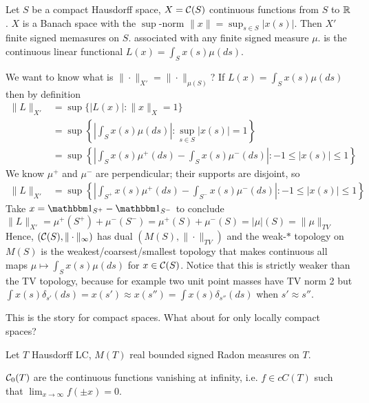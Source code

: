 \begin{example}
  Let $S$ be a compact Hausdorff space,
  $X = \mathcal{C}(S)$ continuous functions from $S$ to $\mathbb{R}$.
  $X$ is a Banach space with the $\sup$-norm $\|x\| = \sup_{s \in S} \lvert x(s) \rvert$.
  Then $X'$ finite signed memasures on $S$.
  associated with any finite signed measure $\mu$.
  is the continuous linear functional $L(x) = \int_S x(s) \mu(ds)$.

  We want to know what is $\|\cdot\|_{X'} = \|\cdot\|_{\mu(S)}$?
  If $L(x) = \int_S x(s) \mu(ds)$ then by definition
  \begin{align*}
    \|L\|_{X'} 
  &= \sup\{ \lvert L(x) \rvert : \|x\|_X = 1 \} \\
  &= \sup\left\{ \left\lvert \int_S x(s) \mu(ds) \right\rvert : \sup_{s \in S} \lvert x(s) \rvert = 1 \right\} \\
  &= \sup\left\{ \left\lvert \int_S x(s) \mu^+(ds)  - \int_S x(s) \mu^-(ds) \right\rvert : -1 \leq \lvert x(s) \rvert \leq 1 \right\}
\end{align*}
We know $\mu^+$ and $\mu^-$ are perpendicular; their supports are disjoint, so
\begin{align*}
  \|L\|_{X'} 
  &= \sup\left\{ \left\lvert 
      \int_{S^+} x(s) \mu^+(ds)  - \int_{S^-} x(s) \mu^-(ds)
  \right\rvert : -1 \leq \lvert x(s) \rvert \leq 1 \right\}
\end{align*}
Take $x = \ind_{S^+} - \ind_{S^-}$ to conclude
$\|L\|_{X'} = \mu^+(S^+) + \mu^-(S^-) = \mu^+(S) + \mu^-(S) = \lvert \mu \rvert(S) = \|\mu\|_{TV}$
Hence, $(\mathcal{C}(S), \|\cdot\|_{\infty})$ has dual
$(M(S), \|\cdot\|_{TV})$ and the weak-$\ast$ topology on $M(S)$
is the weakest/coarsest/smallest topology that makes continuous
all maps $\mu \mapsto \int_S x(s) \mu(ds)$ for $x \in \mathcal{C}(S)$.
Notice that this is strictly weaker than the TV topology, because for example
two unit point masses have TV norm 2 but
$\int x(s) \delta_{s'}(ds) = x(s') \approx x(s'') = \int x(s) \delta_{s''}(ds)$
when $s' \approx s''$.
\end{example}

This is the story for compact spaces. What about for only locally compact spaces?

Let $T$ Hausdorff LC, $M(T)$ real bounded signed Radon measures on $T$.
\begin{definition}
  $\mathcal{C}_0(T)$ are the continuous functions vanishing at infinity, i.e.
  $f \in cC(T)$ such that $\lim_{x \to \infty} f(\pm x) = 0$.
\end{definition}


